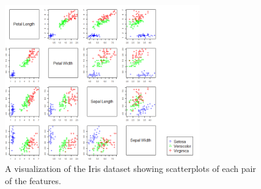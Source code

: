 \documentclass{article}
\begin{document}
\begin{figure}[h]
	\centering
	\includegraphics[width=0.75\textwidth]{iris_colored.png}
	\caption{A visualization of the Iris dataset showing scatterplots of each pair
	of the features.}
	\label{fig:iris_colored}
\end{figure}
\end{document}
